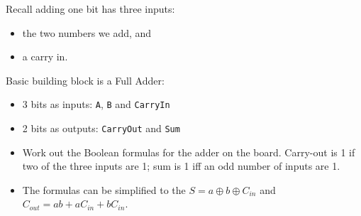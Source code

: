 

\begin{frame}[fragile]
Recall adding one bit has three inputs:
\begin{itemize}
\item the two numbers we add, and 
\item a carry in.
\end{itemize}


  \begin{multicols}{2}
Basic building block is a Full Adder:
\begin{itemize}
    \item 3 bits as inputs: \texttt{A}, \texttt{B} and \texttt{CarryIn}
    \item 2 bits as outputs: \texttt{CarryOut} and \texttt{Sum}
\end{itemize}
\columnbreak
  \end{multicols}

\BNotes\ifnum{}
\begin{itemize}
\item Work out the Boolean formulas for the adder on the board. Carry-out is
	1 if two of the three inputs are 1; sum is 1 iff an odd number of
	inputs are 1.

\item The formulas can be simplified to the $S=a\oplus b\oplus C_{in}$
	and $C_{out}=ab+aC_{in}+bC_{in}$.
\end{itemize}
\fi\ENotes
\end{frame}


